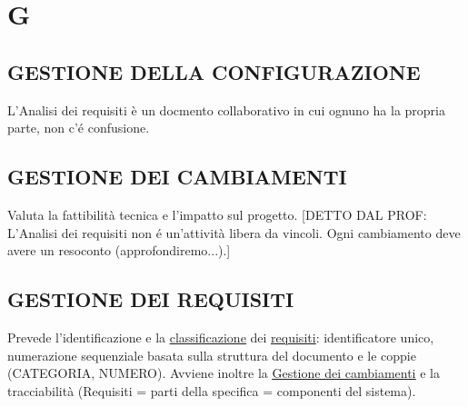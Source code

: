 \newpage
	\flushright{\hyperref[index]{\color{black!65}{Ritorna all'indice}}}\flushleft
	\section{G} \label{sec:G}
		\subsection{GESTIONE DELLA CONFIGURAZIONE}  \label{gestioneconfigurazione}
		L'Analisi dei requisiti è un docmento collaborativo in cui ognuno ha la propria parte, non c'é confusione.
		
		\subsection{GESTIONE DEI CAMBIAMENTI}  \label{gestionecambiamenti}
		Valuta la fattibilità tecnica e l'impatto sul progetto.
		[DETTO DAL PROF: L'Analisi dei requisiti non é un'attività libera da vincoli. Ogni cambiamento deve avere un resoconto (approfondiremo...).]
		
		\subsection{GESTIONE DEI REQUISITI}	 \label{gestionerequisiti}
		Prevede l'identificazione e la \underline{\hyperref[classificazione]{classificazione}} dei \underline{\hyperref[requirements]{requisiti}}: identificatore unico, numerazione sequenziale basata sulla struttura del documento e le coppie (CATEGORIA, NUMERO). Avviene inoltre la \underline{\hyperref[gestionecambiamenti]{Gestione dei cambiamenti}} e la tracciabilità (Requisiti = parti della specifica = componenti del sistema).
		
